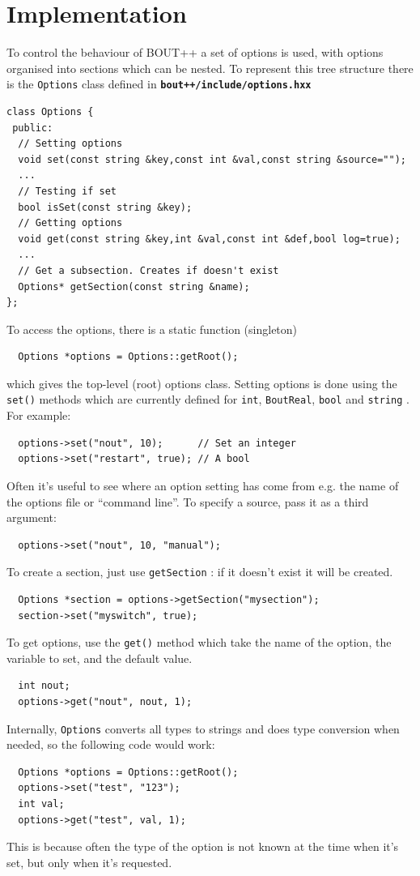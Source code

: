 \documentclass[12pt]{article}
\newcommand{\file}[1]{\texttt{\bf #1}}
\begin{document}
\section{Implementation}
%
%
To control the behaviour of BOUT++ a set of options is used, with options
organised into sections which can be nested. To represent this tree structure
there is the
%
\lstinline!Options!
%
 class defined in \file{bout++/include/options.hxx}
%
\begin{lstlisting}
class Options {
 public:
  // Setting options
  void set(const string &key,const int &val,const string &source="");
  ...
  // Testing if set
  bool isSet(const string &key);
  // Getting options
  void get(const string &key,int &val,const int &def,bool log=true);
  ...
  // Get a subsection. Creates if doesn't exist
  Options* getSection(const string &name);
};
\end{lstlisting}
%
To access the options, there is a static function (singleton)
%
\begin{lstlisting}
  Options *options = Options::getRoot();
\end{lstlisting}
%
which gives the top-level (root) options class. Setting options is done using
the
%
\lstinline!set()!
%
 methods which are currently defined for
%
\lstinline!int!, \lstinline!BoutReal!, \lstinline!bool!
%
 and
%
\lstinline!string!
%
. For example:
%
\begin{lstlisting}
  options->set("nout", 10);      // Set an integer
  options->set("restart", true); // A bool
\end{lstlisting}
%
Often it's useful to see where an option setting has come from e.g. the name of
the options file or ``command line''. To specify a source, pass it as a third
argument:
%
\begin{lstlisting}
  options->set("nout", 10, "manual");
\end{lstlisting}
%
To create a section, just use
%
\lstinline!getSection!
%
: if it doesn't exist it will be created.
%
\begin{lstlisting}
  Options *section = options->getSection("mysection");
  section->set("myswitch", true);
\end{lstlisting}
%
To get options, use the
%
\lstinline!get()!
%
 method which take the name of the option, the variable to set, and the default
 value.
%
\begin{lstlisting}
  int nout;
  options->get("nout", nout, 1);
\end{lstlisting}
%
Internally,
%
\lstinline!Options!
%
 converts all types to strings and does type conversion when needed, so the
 following code would work:
%
\begin{lstlisting}
  Options *options = Options::getRoot();
  options->set("test", "123");
  int val;
  options->get("test", val, 1);
\end{lstlisting}
%
This is because often the type of the option is not known at the time when it's
set, but only when it's requested.
\end{document}
